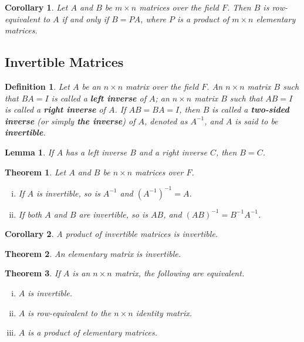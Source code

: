 \documentclass{article}
\newtheorem{theorem}{Theorem}
\newtheorem*{definition*}{Definition}
\newtheorem*{corollary*}{Corollary}
\newtheorem*{lemma*}{Lemma}
\begin{document}
\begin{corollary*}
  Let $A$ and $B$ be $m \times n$ matrices over the field $F$. Then $B$ is
  row-equivalent to $A$ if and only if $B = PA$, where $P$ is a product of $m
  \times n$ elementary matrices.
\end{corollary*}

\subsection{Invertible Matrices}

\begin{definition*}
  Let $A$ be an $n \times n$ matrix over the field $F$. An $n \times n$ matrix
  $B$ such that $BA = I$ is called a \textbf{left inverse} of $A$; an $n \times
  n$ matrix $B$ such that $AB = I$ is called a \textbf{right inverse} of $A$. If
  $AB = BA = I$, then $B$ is called a \textbf{two-sided inverse} (or simply
  \textbf{the inverse}) of $A$, denoted as $A^{-1}$, and $A$ is said to be
  \textbf{invertible}.
\end{definition*}

\begin{lemma*}
  If $A$ has a left inverse $B$ and a right inverse $C$, then $B = C$.
\end{lemma*}

\begin{theorem}
  Let $A$ and $B$ be $n \times n$ matrices over $F$.
  \begin{enumerate}[(i)]
    \item If $A$ is invertible, so is $A^{-1}$ and $(A^{-1})^{-1} = A$.
    \item If both $A$ and $B$ are invertible, so is $AB$, and $(AB)^{-1} =
      B^{-1}A^{-1}$.
  \end{enumerate}
\end{theorem}

\begin{corollary*}
  A product of invertible matrices is invertible.
\end{corollary*}

\begin{theorem}
  An elementary matrix is invertible.
\end{theorem}

\begin{theorem}
  If $A$ is an $n \times n$ matrix, the following are equivalent.
  \begin{enumerate}[(i)]
    \item $A$ is invertible.
    \item $A$ is row-equivalent to the $n \times n$ identity matrix.
    \item $A$ is a product of elementary matrices.
  \end{enumerate}
\end{theorem}
\end{document}
